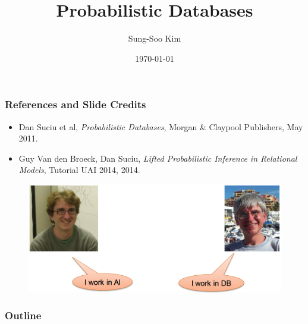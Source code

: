 \documentclass{beamer}
\title[\textit{Flying KIWI}]{Probabilistic Databases} %
\author{Sung-Soo Kim} %
\institute[ETRI] %
{
\textit{sungsoo@etri.re.kr} \\ %
\medskip
Data Management Research Section, ETRI %
}
\date{\today} %
\newcommand{\bi}{\begin{itemize}}
\newcommand{\ei}{\end{itemize}}
\newcommand{\ii}{\item}
\begin{document}
\begin{frame}
\titlepage %
\end{frame}

\begin{frame}
\frametitle{References and Slide Credits}
\bi
\ii Dan Suciu et al, \textit{Probabilistic Databases}, Morgan \& Claypool Publishers, May 2011.
\ii Guy Van den Broeck, Dan Suciu, \textit{Lifted Probabilistic Inference in Relational Models}, Tutorial UAI 2014, 2014.
\ei

\begin{figure}[h]
\centering\includegraphics[width=0.91\linewidth]{authors.png}
\end{figure}

\end{frame}

\begin{frame}
\frametitle{Outline} %
\tableofcontents 
\end{frame}

\end{document}
